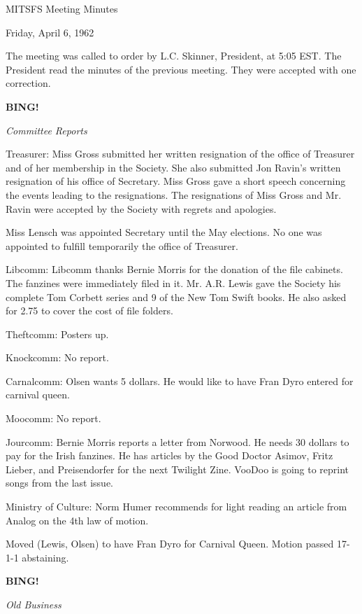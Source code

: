 \documentclass[12pt]{article}
\newcommand{\bing}{{\bf BING!} }
\newcommand{\goto}[1]{\bing \vskip 12pt \centerline{{\em{#1}}}}
\begin{document}
\begin{center}

MITSFS Meeting Minutes

Friday, April 6, 1962

\end{center}
 
\vspace{12pt}

\setlength{\parskip}{6pt}

\noindent
The meeting was called to order by L.C. Skinner, President, at 5:05 EST. The President read the minutes of the previous meeting. They were accepted with one correction.

\goto{Committee Reports}

Treasurer: Miss Gross submitted her written resignation of the office of Treasurer and of her membership in the Society. She also submitted Jon Ravin's written resignation of his office of Secretary. Miss Gross gave a short speech concerning the events leading to the resignations. The resignations of Miss Gross and Mr. Ravin were accepted by the Society with regrets and apologies.

Miss Lensch was appointed Secretary until the May elections. No one was appointed to fulfill temporarily the office of Treasurer.

Libcomm: Libcomm thanks Bernie Morris for the donation of the file cabinets. The fanzines were immediately filed in it. Mr. A.R. Lewis gave the Society his complete Tom Corbett series and 9 of the New Tom Swift books. He also asked for 2.75 to cover the cost of file folders.

Theftcomm: Posters up.

Knockcomm: No report.

Carnalcomm: Olsen wants 5 dollars. He would like to have Fran Dyro entered for carnival queen.

Moocomm: No report.

Jourcomm: Bernie Morris reports a letter from Norwood. He needs 30 dollars to pay for the Irish fanzines. He has articles by the Good Doctor Asimov, Fritz Lieber, and Preisendorfer for the next Twilight Zine. VooDoo is going to reprint songs from the last issue.

Ministry of Culture: Norm Humer recommends for light reading an article from Analog on the 4th law of motion.

Moved (Lewis, Olsen) to have Fran Dyro for Carnival Queen. Motion passed 17-1-1 abstaining.

\goto{Old Business}
\end{document}
